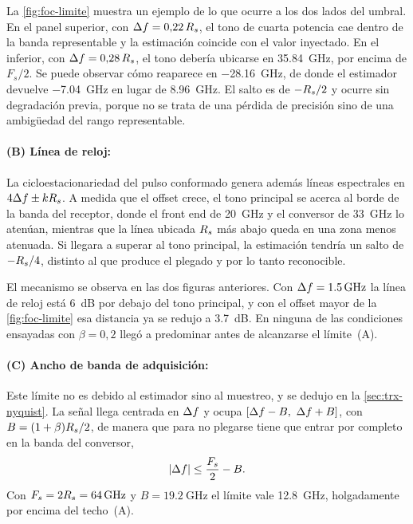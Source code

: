 La \cref{fig:foc-limite} muestra un ejemplo de lo que ocurre a los dos lados
del umbral. En el panel superior, con $\Delta f = 0{,}22\,R_{s}$, el tono de
cuarta potencia cae dentro de la banda representable y la estimaci\'on
coincide con el valor inyectado. En el inferior, con $\Delta f = 0{,}28\,R_{s}$, el
tono deber\'ia ubicarse en \SI{35.84}{\giga\hertz}, por encima de $F_s/2$. Se
puede observar c\'omo reaparece en \SI{-28.16}{\giga\hertz}, de donde el
estimador devuelve \SI{-7.04}{\giga\hertz} en lugar de
\SI{8.96}{\giga\hertz}. El salto es de $-R_{s}/2$ y ocurre sin degradaci\'on
previa, porque no se trata de una p\'erdida de precisi\'on sino de una
ambig\"uedad del rango representable.

\paragraph{(B) L\'inea de reloj:}
La ciclo\-estacionariedad del pulso conformado genera adem\'as l\'ineas
espectrales en $4\Delta f \pm kR_{s}$. A medida que el offset
crece, el tono principal se acerca al borde de la banda del receptor, donde el
front end de \SI{20}{\giga\hertz} y el conversor de \SI{33}{\giga\hertz} lo
aten\'uan, mientras que la l\'inea ubicada $R_{s}$ m\'as abajo queda en una zona
menos atenuada. Si llegara a superar al tono principal, la estimaci\'on
tendr\'ia un salto de  $-R_{s}/4$, distinto al que produce el plegado y por lo
tanto reconocible.

El mecanismo se observa en las dos figuras anteriores. Con
$\Delta f = \SI{1.5}{\giga\hertz}$ la l\'inea de reloj est\'a \SI{6}{\dB} por
debajo del tono principal, y con el offset mayor de la \cref{fig:foc-limite}
esa distancia ya se redujo a \SI{3.7}{\dB}. En ninguna de las condiciones
ensayadas con $\beta = 0{,}2$ lleg\'o a predominar antes de alcanzarse el
l\'imite~(A).

\paragraph{(C) Ancho de banda de adquisici\'on:}
Este l\'imite no es debido al estimador sino al muestreo, y se dedujo en la
\cref{sec:trx-nyquist}. La se\~nal llega centrada en $\Delta f$ y ocupa
$[\Delta f - B,\ \Delta f + B]$, con $B = (1+\beta)R_{s}/2$, de manera que para no
plegarse tiene que entrar por completo en la banda del
conversor,
\begin{equation}
  \left\lvert \Delta f \right\rvert \leq \frac{F_s}{2} - B .
  \label{eq:limite-adc}
\end{equation}
Con $F_s = 2R_{s} = \SI{64}{\giga\hertz}$ y $B = \SI{19.2}{\giga\hertz}$ el
l\'imite vale \SI{12.8}{\giga\hertz}, holgadamente por encima del techo~(A).


